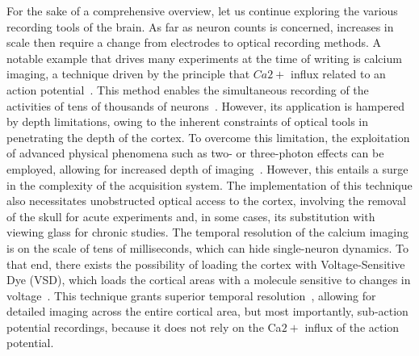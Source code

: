 For the sake of a comprehensive overview, let us continue exploring the various recording tools of the brain. As far as neuron counts is concerned, increases in scale then require a change from electrodes to optical recording methods. A notable example that drives many experiments at the time of writing is calcium imaging, a technique driven by the principle that $Ca2+$ influx related to an action potential~\cite{stosiek2003vivo,friedrich2017fast}. This method enables the simultaneous recording of the activities of tens of thousands of neurons~\cite{stringer2019high}. However, its application is hampered by depth limitations, owing to the inherent constraints of optical tools in penetrating the depth of the cortex. To overcome this limitation, the exploitation of advanced physical phenomena such as two- or three-photon effects can be employed, allowing for increased depth of imaging~\cite{cheng2011simultaneous}. However, this entails a surge in the complexity of the acquisition system. The implementation of this technique also necessitates unobstructed optical access to the cortex, involving the removal of the skull for acute experiments and, in some cases, its substitution with viewing glass for chronic studies. The temporal resolution of the calcium imaging is on the scale of tens of milliseconds, which can hide single-neuron dynamics. To that end, there exists the possibility of loading the cortex with Voltage-Sensitive Dye (VSD), which loads the cortical areas with a molecule sensitive to changes in voltage~\cite{chemla2010voltage}. This technique grants superior temporal resolution~\cite{chemla2010biophysical}, allowing for detailed imaging across the entire cortical area, but most importantly, sub-action potential recordings, because it does not rely on the Ca$2+$ influx of the action potential.

